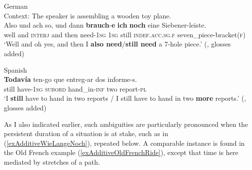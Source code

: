 \begin{exe}
	 German\\
	Context: The speaker is assembling a wooden toy plane.\\
	\gll Also und {ach so}, und dann \textbf{brauch}-\textbf{e} \textbf{ich} \textbf{noch} eine Siebener-leiste.\\
	well and \textsc{interj} and then need-1\textsc{sg} 1\textsc{sg} still \textsc{indef}.\textsc{acc}.\textsc{sg}.\textsc{f} seven\_piece-bracket(\textsc{f})\\
	\glt \lq Well and oh yes, and then I \textbf{also need}/\textbf{still need} a 7-hole piece.\rq{ }(\cite[104]{Nederstigt2003}, glosses added)

	\ex Spanish\label{exAdditiveSpanishInformes}\\
	\gll \textbf{Todavía} ten-go que entreg-ar dos informe-s.\\
	still have-1\textsc{sg} \textsc{subord} hand\_in-\textsc{inf} two report-\textsc{pl}\\
	\glt \lq I \textbf{still} have to hand in two reports / I still have to hand in two \textbf{more} reports.\rq{ }(\cite[214]{Bosque2016}, glosses added)
\end{exe}

As I also indicated earlier, such ambiguities are particularly pronounced when the persistent duration of a situation is at stake, such as in (\ref{exAdditiveWieLangeNoch}), repeated below. A comparable instance is found in the Old French example (\ref{exAdditiveOldFrenchRide}), except that time is here mediated by stretches of a path.


